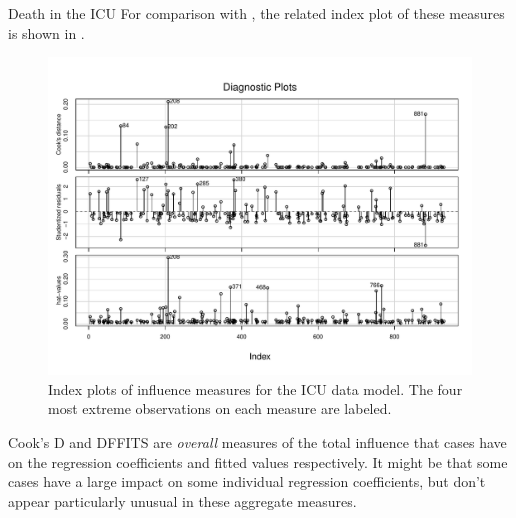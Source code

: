 \documentclass[11pt]{book}
\renewenvironment{knitrout}{\small\renewcommand{\baselinestretch}{.85}}{} %
\begin{document}
\begin{Example}[icu2]{Death in the ICU}
For comparison with , the related index plot of
these measures is shown in .

\begin{knitrout}
\color{fgcolor}\begin{kframe}
\begin{alltt}
 \hlstd{=}\hlstd{(}\hlstd{,} \hlstd{,} \hlstd{),} \hlstd{=}\hlstd{)}
\end{alltt}
\end{kframe}\begin{figure}[!htbp]


\centerline{\includegraphics[width=.8\textwidth]{ch07/fig/icu2-infl-index} }

\caption[Index plots of influence measures for the ICU data model]{Index plots of influence measures for the ICU data model. The four most extreme observations on each measure are labeled.\label{fig:icu2-infl-index}}
\end{figure}


\end{knitrout}

Cook's D and DFFITS are \emph{overall} measures of the total influence that cases have
on the regression coefficients and fitted values respectively.
It might be that some cases have a large impact on some individual regression coefficients,
but don't appear particularly unusual in these aggregate measures.


\end{Example}
\end{document}
